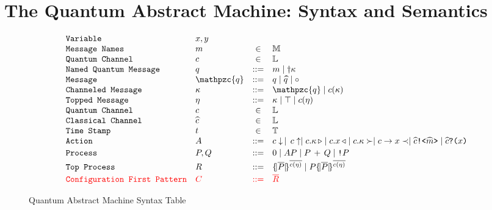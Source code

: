 \section{The Quantum Abstract Machine:  Syntax and Semantics} \label{sec:qam}

\begin{figure}[t]
{\small
  \[\begin{array}{llcl} 
      \texttt{Variable} & x,y \\
      \texttt{Message Names} & m &\in& \mathbb{M}\\
    \texttt{Quantum Channel} & c &\in& \Ls\\
      \texttt{Named Quantum Message} & q &::=& m\mid \up{\kappa}\\
      \texttt{Message} & \mathpzc{q} &::=& q \mid \wideparen{q} \mid \circ \\
      \texttt{Channeled Message} & \kappa &::=& \mathpzc{q} \mid c(\kappa) \\
      \texttt{Topped Message} & \eta &::=& \kappa \mid \top \mid c(\eta) \\
    \texttt{Quantum Channel} & c &\in& \Ls\\
    \texttt{Classical Channel} & \wideparen{c} &\in& \Ls\\
    \texttt{Time Stamp} & t &\in& \mathbb{T}\\
\ignore{
    \texttt{Timed Label} & \alpha^t &::=& \qsend{p}{c}{m}^{t}\\
    \texttt{Label} & \iota &::=& c.m \mid p.c.m \mid \alpha^t \mid \emptyset\\
} 


      \texttt{Action} & A & ::= & \downa{c}\,\mid \,\upa{c}\mid \encode{c.\kappa} \mid \decode{c.x} \mid \chan{c.\kappa}\mid \msga{c}{x} \mid \csenda{\wideparen{c}}{\wideparen{m}}\mid\creva{\wideparen{c}}{x} \\[0.2em]

      \texttt{Process} & P,Q & ::= & 0 \mid AP\mid \parp{P}{Q}\mid \comp{P} \\[0.2em]
      \texttt{Top Process} & R & ::= &\pscell{\overline{P}}{\overline{c(\eta)}} \mid P\pscell{\overline{P}}{\overline{c(\eta)}} \\[0.2em]
      \textcolor{red}{\texttt{Configuration First Pattern}} & \textcolor{red}{C} & \textcolor{red}{::=} & \textcolor{red}{\overline{R}}
    \end{array}
  \]
}
\caption{Quantum Abstract Machine Syntax Table}
  \label{fig:q-pi-syntax}
\end{figure}

